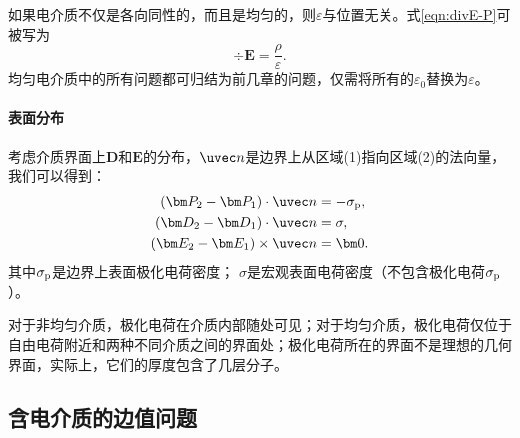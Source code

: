 如果电介质不仅是各向同性的，而且是均匀的，则$\varepsilon$与位置无关。式\eqref{eqn:divE-P}可被写为 
\begin{equation}
    \div\bm E=\frac\rho\varepsilon.
\end{equation}
均匀电介质中的所有问题都可归结为前几章的问题，仅需将所有的$\varepsilon_0$替换为$\varepsilon$。

\paragraph{表面分布}

考虑介质界面上$\bm D$和$\bm E$的分布，$\uvec n$是边界上从区域(1)指向区域(2)的法向量，我们可以得到：
\begin{subequations}
    \begin{align}
        \label{eqn:Pn2-Pn1}
        (\bm P_2-\bm P_1)\cdot\uvec n&=-\sigma_\pol,\\
        \label{eqn:Dn2-Dn1}
        (\bm D_2-\bm D_1)\cdot\uvec n&=\sigma,\\
        \label{eqn:Et2-Et1}
        (\bm E_2-\bm E_1)\times\uvec n&=\bm 0.
    \end{align}
\end{subequations}
其中$\sigma_{\mathrm{p}}$是边界上表面极化电荷密度；
$\sigma$是宏观表面电荷密度（不包含极化电荷$\sigma_{\mathrm{p}}$）。

对于非均匀介质，极化电荷在介质内部随处可见；对于均匀介质，极化电荷仅位于自由电荷附近和两种不同介质之间的界面处；极化电荷所在的界面不是理想的几何界面，实际上，它们的厚度包含了几层分子。

\subsection{含电介质的边值问题}
\label{ssec:boundary-value problem with dielectrics}

